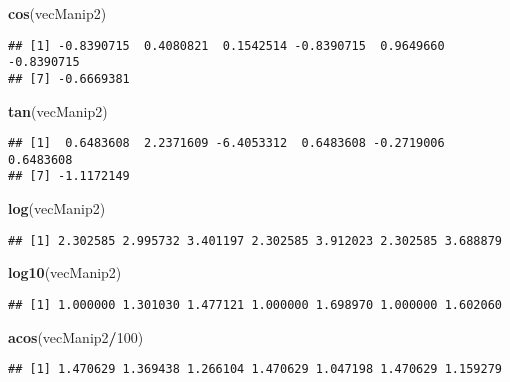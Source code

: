 \documentclass[]{book}
\newenvironment{Shaded}{\begin{snugshade}}{\end{snugshade}}
\newcommand{\KeywordTok}[1]{\textcolor[rgb]{0.13,0.29,0.53}{\textbf{#1}}}
\newcommand{\DecValTok}[1]{\textcolor[rgb]{0.00,0.00,0.81}{#1}}
\newcommand{\OperatorTok}[1]{\textcolor[rgb]{0.81,0.36,0.00}{\textbf{#1}}}
\newcommand{\NormalTok}[1]{#1}
\theoremstyle{definition}
\theoremstyle{definition}
\theoremstyle{definition}
\theoremstyle{remark}
\begin{document}
\begin{Shaded}
\begin{Highlighting}[]
\KeywordTok{cos}\NormalTok{(vecManip2)}
\end{Highlighting}
\end{Shaded}

\begin{verbatim}
## [1] -0.8390715  0.4080821  0.1542514 -0.8390715  0.9649660 -0.8390715
## [7] -0.6669381
\end{verbatim}

\begin{Shaded}
\begin{Highlighting}[]
\KeywordTok{tan}\NormalTok{(vecManip2)}
\end{Highlighting}
\end{Shaded}

\begin{verbatim}
## [1]  0.6483608  2.2371609 -6.4053312  0.6483608 -0.2719006  0.6483608
## [7] -1.1172149
\end{verbatim}

\begin{Shaded}
\begin{Highlighting}[]
\KeywordTok{log}\NormalTok{(vecManip2)}
\end{Highlighting}
\end{Shaded}

\begin{verbatim}
## [1] 2.302585 2.995732 3.401197 2.302585 3.912023 2.302585 3.688879
\end{verbatim}

\begin{Shaded}
\begin{Highlighting}[]
\KeywordTok{log10}\NormalTok{(vecManip2)}
\end{Highlighting}
\end{Shaded}

\begin{verbatim}
## [1] 1.000000 1.301030 1.477121 1.000000 1.698970 1.000000 1.602060
\end{verbatim}

\begin{Shaded}
\begin{Highlighting}[]
\KeywordTok{acos}\NormalTok{(vecManip2}\OperatorTok{/}\DecValTok{100}\NormalTok{)}
\end{Highlighting}
\end{Shaded}

\begin{verbatim}
## [1] 1.470629 1.369438 1.266104 1.470629 1.047198 1.470629 1.159279
\end{verbatim}
\end{document}
